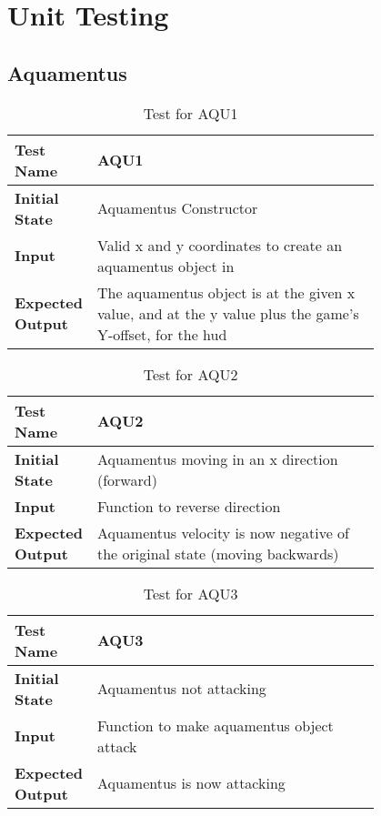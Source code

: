 \documentclass[12pt, titlepage]{article}
\begin{document}
\section{Unit Testing}

\subsection{Aquamentus}

\begin{table}[!htbp]
	
	\begin{tabular}[r]{|l|p{0.8\linewidth}|}
		
		\hline
		
		\textbf{Test Name} & AQU1 \\ 
		\hline
		\textbf{Initial State} & Aquamentus Constructor \\ 
		\hline
		\textbf{Input} & Valid x and y coordinates to create an aquamentus object in \\ 
		\hline 
		\textbf{Expected Output} & The aquamentus object is at the given x value, and at the y value plus the game's Y-offset, for the hud\\ 
		\hline
		
	\end{tabular}
	\caption{Test for AQU1}
	\label{Table}
\end{table}

\begin{table}[!htbp]
	
	\begin{tabular}[r]{|l|p{0.8\linewidth}|}
		
		\hline
		
		\textbf{Test Name} & AQU2 \\ 
		\hline
		\textbf{Initial State} & Aquamentus moving in an x direction (forward) \\ 
		\hline
		\textbf{Input} & Function to reverse direction \\ 
		\hline 
		\textbf{Expected Output} & Aquamentus velocity is now negative of the original state (moving backwards)  \\ 
		\hline
		
	\end{tabular}
	\caption{Test for AQU2}
	\label{Table}
\end{table}

\begin{table}[!htbp]
	
	\begin{tabular}[r]{|l|p{0.8\linewidth}|}
		
		\hline
		
		\textbf{Test Name} & AQU3 \\ 
		\hline
		\textbf{Initial State} & Aquamentus not attacking \\ 
		\hline
		\textbf{Input} & Function to make aquamentus object attack \\ 
		\hline 
		\textbf{Expected Output} & Aquamentus is now attacking  \\ 
		\hline
		
	\end{tabular}
	\caption{Test for AQU3}
	\label{Table}
\end{table}
\end{document}
